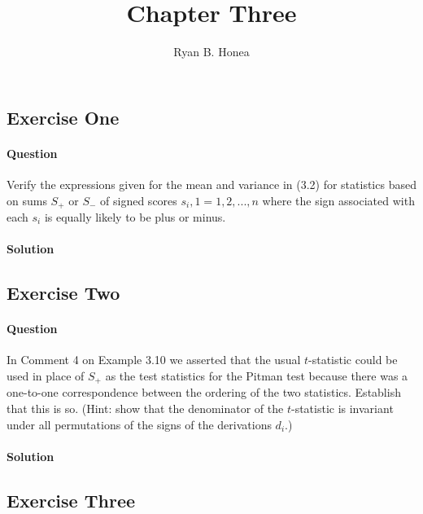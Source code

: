 \documentclass[]{article}
\title{Chapter Three}
\author{Ryan B. Honea}
\date{}
\let\oldparagraph\paragraph
\renewcommand{\paragraph}[1]{\oldparagraph{#1}\mbox{}}
\begin{document}
\maketitle

\subsection{Exercise One}\label{exercise-one}

\paragraph{Question}\label{question}

Verify the expressions given for the mean and variance in (3.2) for
statistics based on sums \(S_+\) or \(S_-\) of signed scores
\(s_i, 1 = 1,2,...,n\) where the sign associated with each \(s_i\) is
equally likely to be plus or minus.

\paragraph{Solution}\label{solution}

\subsection{Exercise Two}\label{exercise-two}

\paragraph{Question}\label{question-1}

In Comment 4 on Example 3.10 we asserted that the usual \(t\)-statistic
could be used in place of \(S_+\) as the test statistics for the Pitman
test because there was a one-to-one correspondence between the ordering
of the two statistics. Establish that this is so. (Hint: show that the
denominator of the \(t\)-statistic is invariant under all permutations
of the signs of the derivations \(d_i\).)

\paragraph{Solution}\label{solution-1}

\subsection{Exercise Three}\label{exercise-three}
\end{document}
